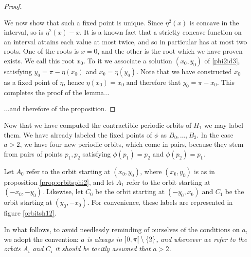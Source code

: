 \begin{proof}
\begin{lemmaproof}
We now show that such a fixed point is unique. Since $\eta^2(x)$ is concave in the interval, so is $\eta^2(x) - x$. It is a known fact that a strictly concave function on an interval attains each value at most twice, and so in particular has at most two roots. One of the roots is $x = 0$, and the other is the root which we have proven exists. We call this root $x_0$. To it we associate a solution $(x_0, y_0)$ of \eqref{phi2id3}, satisfying $y_0 = \pi - \eta(x_0)$ and $x_0 = \eta(y_0)$. Note that we have constructed $x_0$ as a fixed point of $\eta$, hence $\eta(x_0) = x_0$ and therefore that $y_0 = \pi - x_0$. This completes the proof of the lemma...
\end{lemmaproof}
...and therefore of the proposition.
\end{proof}

Now that we have computed the contractible periodic orbits of $H_1$ we may label them. We have already labeled the fixed points of $\phi$ as $B_0, \dots, B_3$. In the case $a > 2$, we have four new periodic orbits, which come in pairs, because they stem from pairs of points $p_1, p_2$ satisfying $\phi(p_1) = p_2$ and $\phi(p_2) = p_1$.

Let $A_0$ refer to the orbit starting at $(x_0, y_0)$, where $(x_0, y_0)$ is as in proposition \ref{prop:orbitsphi2}, and let $A_1$ refer to the orbit starting at $(-x_0, -y_0)$. Likewise, let $C_0$ be the orbit starting at $(-y_0, x_0)$ and $C_1$ be the orbit starting at $(y_0, -x_0)$. For convenience, these labels are represented in figure \ref{orbitsh12}.

In what follows, to avoid needlessly reminding of ourselves of the conditions on $a$, we adopt the convention: \emph{$a$ is always in $\ointerval 0 \pi \setminus \{2\}$, and whenever we refer to the orbits $A_i$ and $C_i$ it should be tacitly assumed that $a > 2$.}

